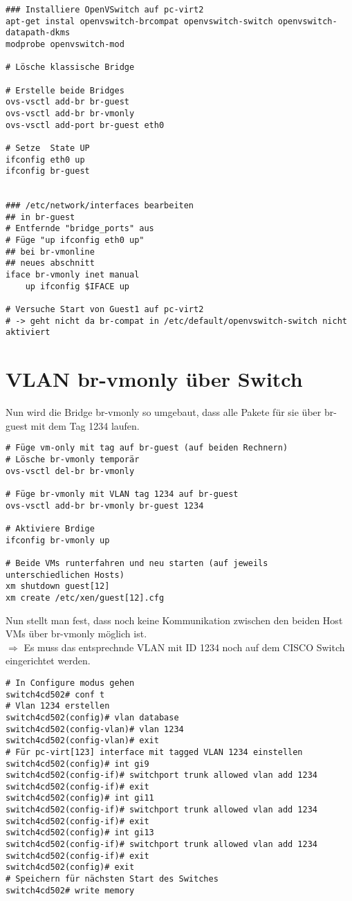\setupVerbatimOut
\begin{verbatim}
### Installiere OpenVSwitch auf pc-virt2
apt-get instal openvswitch-brcompat openvswitch-switch openvswitch-datapath-dkms
modprobe openvswitch-mod

# Lösche klassische Bridge

# Erstelle beide Bridges
ovs-vsctl add-br br-guest
ovs-vsctl add-br br-vmonly
ovs-vsctl add-port br-guest eth0

# Setze  State UP
ifconfig eth0 up
ifconfig br-guest


### /etc/network/interfaces bearbeiten
## in br-guest
# Entfernde "bridge_ports" aus
# Füge "up ifconfig eth0 up" 
## bei br-vmonline
## neues abschnitt
iface br-vmonly inet manual
    up ifconfig $IFACE up
    
# Versuche Start von Guest1 auf pc-virt2
# -> geht nicht da br-compat in /etc/default/openvswitch-switch nicht aktiviert
\end{verbatim}

\section{VLAN br-vmonly über Switch}

Nun wird die Bridge br-vmonly so umgebaut, dass alle Pakete für sie über br-guest mit dem Tag 1234 laufen.

\setupVerbatimOut
\begin{verbatim}
# Füge vm-only mit tag auf br-guest (auf beiden Rechnern)
# Lösche br-vmonly temporär
ovs-vsctl del-br br-vmonly

# Füge br-vmonly mit VLAN tag 1234 auf br-guest
ovs-vsctl add-br br-vmonly br-guest 1234

# Aktiviere Brdige
ifconfig br-vmonly up

# Beide VMs runterfahren und neu starten (auf jeweils unterschiedlichen Hosts)
xm shutdown guest[12]
xm create /etc/xen/guest[12].cfg
\end{verbatim}

Nun stellt man fest, dass noch keine Kommunikation zwischen den beiden Host VMs über br-vmonly möglich ist. 
\\
$\Rightarrow$ Es muss das entsprechnde VLAN mit ID 1234 noch auf dem CISCO Switch eingerichtet werden.

\setupVerbatimOut
\begin{verbatim}
# In Configure modus gehen
switch4cd502# conf t
# Vlan 1234 erstellen
switch4cd502(config)# vlan database 
switch4cd502(config-vlan)# vlan 1234
switch4cd502(config-vlan)# exit
# Für pc-virt[123] interface mit tagged VLAN 1234 einstellen 
switch4cd502(config)# int gi9 
switch4cd502(config-if)# switchport trunk allowed vlan add 1234
switch4cd502(config-if)# exit
switch4cd502(config)# int gi11
switch4cd502(config-if)# switchport trunk allowed vlan add 1234
switch4cd502(config-if)# exit
switch4cd502(config)# int gi13
switch4cd502(config-if)# switchport trunk allowed vlan add 1234
switch4cd502(config-if)# exit
switch4cd502(config)# exit
# Speichern für nächsten Start des Switches
switch4cd502# write memory
\end{verbatim}

